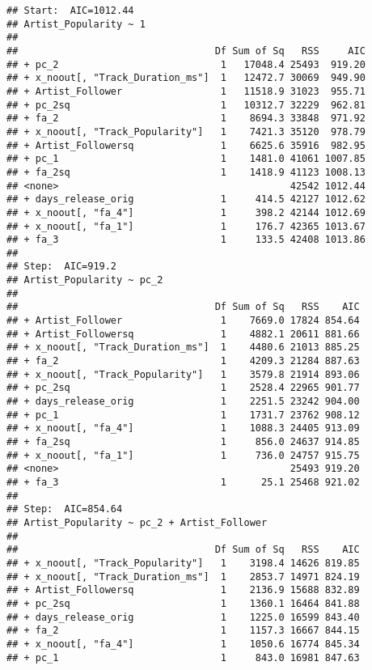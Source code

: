 \documentclass[
]{article}
\begin{document}
\begin{verbatim}
## Start:  AIC=1012.44
## Artist_Popularity ~ 1
## 
##                                  Df Sum of Sq   RSS     AIC
## + pc_2                            1   17048.4 25493  919.20
## + x_noout[, "Track_Duration_ms"]  1   12472.7 30069  949.90
## + Artist_Follower                 1   11518.9 31023  955.71
## + pc_2sq                          1   10312.7 32229  962.81
## + fa_2                            1    8694.3 33848  971.92
## + x_noout[, "Track_Popularity"]   1    7421.3 35120  978.79
## + Artist_Followersq               1    6625.6 35916  982.95
## + pc_1                            1    1481.0 41061 1007.85
## + fa_2sq                          1    1418.9 41123 1008.13
## <none>                                        42542 1012.44
## + days_release_orig               1     414.5 42127 1012.62
## + x_noout[, "fa_4"]               1     398.2 42144 1012.69
## + x_noout[, "fa_1"]               1     176.7 42365 1013.67
## + fa_3                            1     133.5 42408 1013.86
## 
## Step:  AIC=919.2
## Artist_Popularity ~ pc_2
## 
##                                  Df Sum of Sq   RSS    AIC
## + Artist_Follower                 1    7669.0 17824 854.64
## + Artist_Followersq               1    4882.1 20611 881.66
## + x_noout[, "Track_Duration_ms"]  1    4480.6 21013 885.25
## + fa_2                            1    4209.3 21284 887.63
## + x_noout[, "Track_Popularity"]   1    3579.8 21914 893.06
## + pc_2sq                          1    2528.4 22965 901.77
## + days_release_orig               1    2251.5 23242 904.00
## + pc_1                            1    1731.7 23762 908.12
## + x_noout[, "fa_4"]               1    1088.3 24405 913.09
## + fa_2sq                          1     856.0 24637 914.85
## + x_noout[, "fa_1"]               1     736.0 24757 915.75
## <none>                                        25493 919.20
## + fa_3                            1      25.1 25468 921.02
## 
## Step:  AIC=854.64
## Artist_Popularity ~ pc_2 + Artist_Follower
## 
##                                  Df Sum of Sq   RSS    AIC
## + x_noout[, "Track_Popularity"]   1    3198.4 14626 819.85
## + x_noout[, "Track_Duration_ms"]  1    2853.7 14971 824.19
## + Artist_Followersq               1    2136.9 15688 832.89
## + pc_2sq                          1    1360.1 16464 841.88
## + days_release_orig               1    1225.0 16599 843.40
## + fa_2                            1    1157.3 16667 844.15
## + x_noout[, "fa_4"]               1    1050.6 16774 845.34
## + pc_1                            1     843.0 16981 847.63

\end{verbatim}
\end{document}
